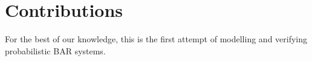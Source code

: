 \section{Contributions}
For the best of our knowledge, this is the first attempt of modelling and verifying probabilistic BAR systems. 